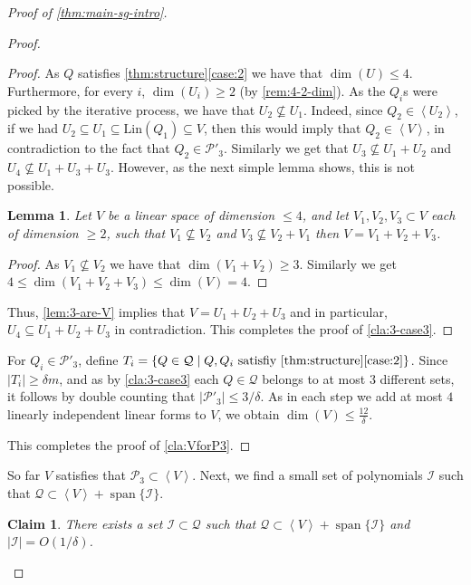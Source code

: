 \documentclass[10pt,a4paper]{article}
\newtheorem{claim}[theorem]{Claim}
\newtheorem{lemma}[theorem]{Lemma}
\newcommand{\cI}{{\mathcal{I}}}
\newcommand{\cQ}{{\mathcal{Q}}}
\newcommand{\calP}{{\mathcal{P}}}
\newcommand{\ideal}[1]{\left \langle{#1}\right \rangle}
\newcommand{\spn}[1]{\operatorname{span}\{{#1}\}}
\newcommand{\MS}{\text{Lin}}
\begin{document}
\begin{proof}[Proof of \autoref{thm:main-sg-intro}]
\begin{proof}
\begin{proof}
As $Q$ satisfies \autoref{thm:structure}\ref{case:2} we have that  $\dim(U) \leq 4$. Furthermore, for every $i$, $\dim(U_i)\geq 2$ (by \autoref{rem:4-2-dim}). As the $Q_i$s were picked by the iterative process, we have that $U_2 \not \subseteq U_1$. Indeed, since $Q_2 \in \ideal{U_2}$, if we had $U_2 \subseteq U_1\subseteq  \MS(Q_1)\subseteq V$, then this would imply that $Q_2\in\ideal{V}$, in contradiction to the fact that $Q_2\in \calP'_3$. Similarly we get that
$U_3 \not \subseteq U_1 + U_2$ and  $U_4 \not \subseteq U_1+U_3 +U_3$. However, as the next simple lemma shows, this is not possible.
\begin{lemma} \label{lem:3-are-V}
Let $V$ be a linear space of dimension $\leq 4$, and let $V_1,V_2,V_3 \subset V$ each of dimension $\geq 2$, such that $V_1\not \subseteq V_2$ and  $V_3\not \subseteq V_2 + V_1$ then $V = V_1+V_2+V_3$.
\end{lemma}
\begin{proof}
As $V_1\not \subseteq V_2$ we have that $\dim(V_1+V_2)\geq 3$. Similarly we get 
$4\leq \dim(V_1+V_2+V_3)\leq \dim(V)=4$.
\end{proof}
Thus, \autoref{lem:3-are-V} implies that $V=U_1+U_2+U_3$ and in particular, $U_4 \subseteq U_1+U_2+U_3$ in contradiction. This completes the proof of \autoref{cla:3-case3}.
\end{proof}

For $Q_i \in \calP'_3$, define $T_i =\{Q\in \cQ \mid Q,Q_i \text{ satisfiy \autoref{thm:structure}\ref{case:2}}\}$. Since $|T_{i}|\geq \delta m$, and as by \autoref{cla:3-case3} each $Q\in \cQ$ belongs to at most $3$ different sets, it follows by double counting that  $|\calP'_3|\leq 3/\delta$.
As in each step we add at most $4$ linearly independent linear forms to $V$, we obtain $\dim(V)\leq \frac{12}{\delta}$.

This completes the proof of \autoref{cla:VforP3}.
\end{proof}

So far $V$ satisfies that $\calP_3 \subset \ideal{V}$. Next, we find a small set of polynomials $\cI$ such that $\cQ \subset \ideal{V}+\spn{\cI}$. 



\begin{claim}\label{cla:Iexists}
There exists a set $\cI\subset \cQ$ such that $\cQ \subset \ideal{V}+\spn{\cI}$ and $|\cI|= O(1/\delta) $. 
\end{claim}


\end{proof}
\end{document}

